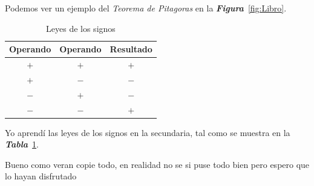 Podemos ver un ejemplo del \emph{Teorema de Pitagoras} en la
\emph{\textbf{Figura}}~\ref{fig:Libro}.


\begin{table}[h]
  \centering
  \begin{tabular}{| c  c  c  |}
    \hline
    Operando & Operando & Resultado\\\hline
    $+$ & $+$ & $+$\\\hline
    $+$ & $-$ & $-$\\\hline
    $-$ & $+$ & $-$\\\hline
    $-$ & $-$ & $+$\\\hline    
  \end{tabular}
  \caption{Leyes de los signos}
  \label{tabla:leyes_signos}
\end{table}

Yo aprendí las leyes de los signos en la secundaria, tal como
se muestra en la \textbf{\emph{Tabla}}~\ref{tabla:leyes_signos}.

Bueno como veran copie todo, en realidad no se si puse todo bien pero espero que lo hayan disfrutado
